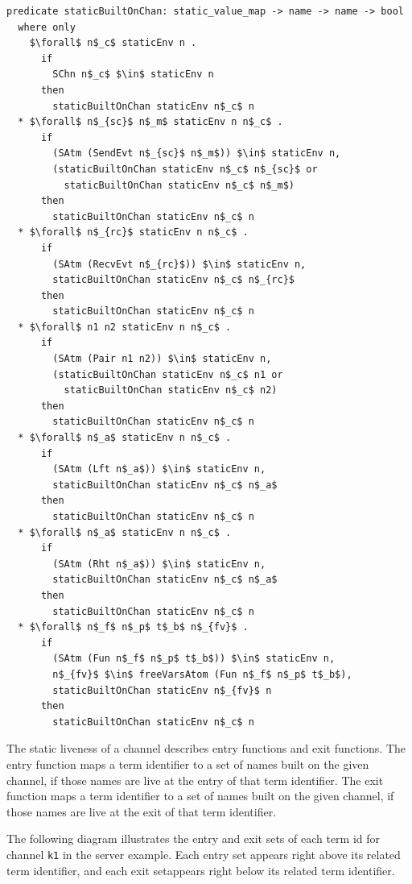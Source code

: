 \documentclass[letterpaper, 11pt]{extarticle}
\begin{document}
\begin{lstlisting}[language=logic, mathescape]
  predicate staticBuiltOnChan: static_value_map -> name -> name -> bool
  where only
    $\forall$ n$_c$ staticEnv n .
      if 
        SChn n$_c$ $\in$ staticEnv n 
      then 
        staticBuiltOnChan staticEnv n$_c$ n
  * $\forall$ n$_{sc}$ n$_m$ staticEnv n n$_c$ . 
      if
        (SAtm (SendEvt n$_{sc}$ n$_m$)) $\in$ staticEnv n,
        (staticBuiltOnChan staticEnv n$_c$ n$_{sc}$ or
          staticBuiltOnChan staticEnv n$_c$ n$_m$)
      then 
        staticBuiltOnChan staticEnv n$_c$ n
  * $\forall$ n$_{rc}$ staticEnv n n$_c$ . 
      if  
        (SAtm (RecvEvt n$_{rc}$)) $\in$ staticEnv n,
        staticBuiltOnChan staticEnv n$_c$ n$_{rc}$
      then 
        staticBuiltOnChan staticEnv n$_c$ n
  * $\forall$ n1 n2 staticEnv n n$_c$ . 
      if  
        (SAtm (Pair n1 n2)) $\in$ staticEnv n,
        (staticBuiltOnChan staticEnv n$_c$ n1 or
          staticBuiltOnChan staticEnv n$_c$ n2)
      then 
        staticBuiltOnChan staticEnv n$_c$ n
  * $\forall$ n$_a$ staticEnv n n$_c$ .
      if
        (SAtm (Lft n$_a$)) $\in$ staticEnv n,
        staticBuiltOnChan staticEnv n$_c$ n$_a$
      then 
        staticBuiltOnChan staticEnv n$_c$ n
  * $\forall$ n$_a$ staticEnv n n$_c$ .
      if
        (SAtm (Rht n$_a$)) $\in$ staticEnv n,
        staticBuiltOnChan staticEnv n$_c$ n$_a$
      then 
        staticBuiltOnChan staticEnv n$_c$ n
  * $\forall$ n$_f$ n$_p$ t$_b$ n$_{fv}$ .
      if
        (SAtm (Fun n$_f$ n$_p$ t$_b$)) $\in$ staticEnv n,
        n$_{fv}$ $\in$ freeVarsAtom (Fun n$_f$ n$_p$ t$_b$),
        staticBuiltOnChan staticEnv n$_{fv}$ n
      then
        staticBuiltOnChan staticEnv n$_c$ n
\end{lstlisting}


The static liveness of a channel describes entry functions and exit functions.
The entry function maps a term identifier to a set of names built on
the given channel, if those names are live at the entry of that term identifier.
The exit function maps a term identifier to a
set of names built on the given channel, if those names are live at the exit of that
term identifier.

The following diagram illustrates the entry and exit sets of each term id
for channel \lstinline{k1} in
the server example.  Each entry set appears right above its related term identifier,
and each exit setappears right below its related term identifier. 
\end{document}
